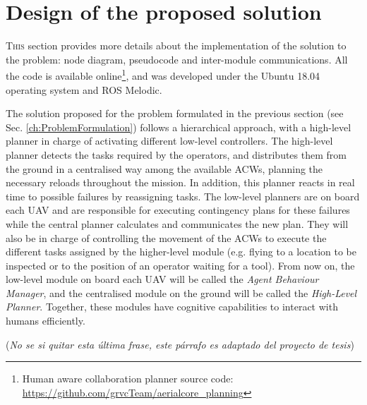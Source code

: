 \chapter{Design of the proposed solution}
\label{ch:DesignOfTheProposedSolution}
\lettrine[lraise=-0.1, lines=2, loversize=0.2]{T}{his} section provides more details about the implementation of the solution to the problem: node diagram, pseudocode and inter-module communications. All the code is available online\footnote{Human aware collaboration planner source code: \url{https://github.com/grvcTeam/aerialcore_planning}}, and was developed under the Ubuntu 18.04 operating system and ROS Melodic.

The solution proposed for the problem formulated in the previous section (see Sec. \ref{ch:ProblemFormulation}) follows a hierarchical approach, with a high-level planner in charge of activating different low-level controllers. The high-level planner detects the tasks required by the operators, and distributes them from the ground in a centralised way among the available \glspl{ACW}, planning the necessary reloads throughout the mission. In addition, this planner reacts in real time to possible failures by reassigning tasks. The low-level planners are on board each \gls{UAV} and are responsible for executing contingency plans for these failures while the central planner calculates and communicates the new plan. They will also be in charge of controlling the movement of the \glspl{ACW} to execute the different tasks assigned by the higher-level module (e.g. flying to a location to be inspected or to the position of an operator waiting for a tool). From now on, the low-level module on board each \gls{UAV} will be called the \emph{Agent Behaviour Manager}, and the centralised module on the ground will be called the \emph{High-Level Planner}. Together, these modules have cognitive capabilities to interact with humans efficiently. 

(\emph{No se si quitar esta última frase, este párrafo es adaptado del proyecto de tesis})


